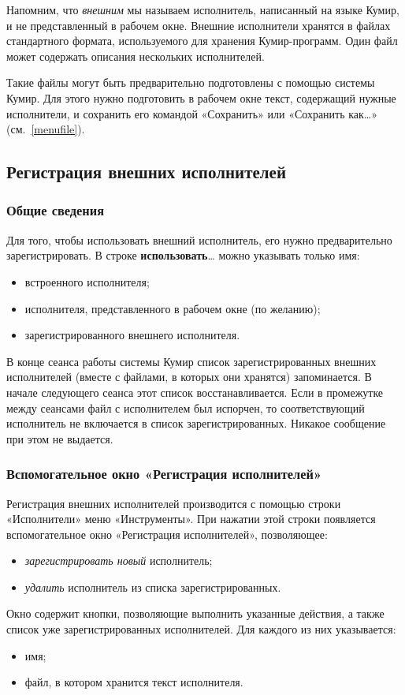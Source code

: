\documentclass[12pt,a4paper]{article}
\begin{document}
Напомним, что \emph{внешним} мы называем исполнитель, написанный на языке Кумир, и не представленный в рабочем окне. Внешние исполнители хранятся в файлах стандартного формата, используемого для хранения Кумир-программ. Один файл может содержать описания нескольких исполнителей. 

Такие файлы могут быть предварительно подготовлены с помощью системы Кумир. Для этого нужно подготовить в рабочем окне текст, содержащий нужные исполнители, и сохранить его командой «Сохранить» или «Сохранить как\dots» (см.~\ref{menufile}).

\subsection{Регистрация внешних исполнителей}
\label{reg-isps}

\subsubsection{Общие сведения}

Для того, чтобы использовать внешний исполнитель, его нужно предварительно зарегистрировать. В строке \textsf{\textbf{использовать}\dots} можно указывать только имя:
\begin{itemize}
\item встроенного исполнителя;
\item исполнителя, представленного в рабочем окне (по желанию);
\item зарегистрированного внешнего исполнителя.
\end{itemize}

В конце сеанса работы системы Кумир список зарегистрированных внешних исполнителей (вместе с файлами, в которых они хранятся) запоминается. В начале следующего сеанса этот список восстанавливается. Если в промежутке между сеансами файл с исполнителем был испорчен, то соответствующий исполнитель не включается в список зарегистрированных. Никакое сообщение при этом не выдается.

\subsubsection{Вспомогательное окно «Регистрация исполнителей»}
Регистрация внешних исполнителей производится с помощью строки «Исполнители» меню «Инструменты». При нажатии этой строки появляется вспомогательное окно «Регистрация исполнителей», позволяющее:
\begin{itemize}
\item \emph{зарегистрировать новый} исполнитель;
\item \emph{удалить} исполнитель из списка зарегистрированных.
\end{itemize}
Окно содержит кнопки, позволяющие выполнить указанные действия, а также список уже зарегистрированных исполнителей. Для каждого из них указывается:
\begin{itemize}
\item имя;
\item файл, в котором хранится текст исполнителя.
\end{itemize}
\end{document}

